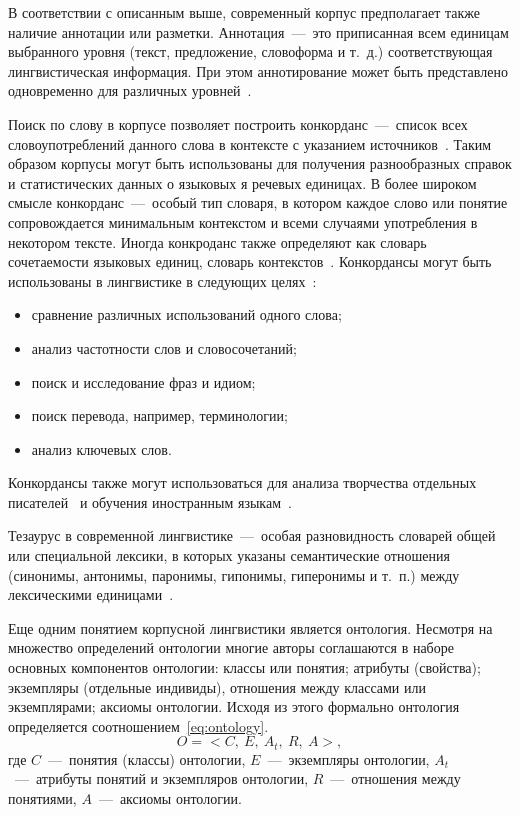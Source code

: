 В соответствии с описанным выше, современный корпус предполагает также наличие аннотации или разметки. Аннотация~---~это приписанная всем единицам выбранного уровня (текст, предложение, словоформа и т.~д.) соответствующая лингвистическая информация. При этом аннотирование может быть представлено одновременно для различных уровней~\cite{Kopotev}.

Поиск по слову в корпусе позволяет построить конкорданс~---~список всех словоупотреблений данного слова в контексте с указанием источников~\cite{Zaharov}. Таким образом корпусы могут быть использованы для получения разнообразных справок и статистических данных о языковых я речевых единицах. В более широком смысле конкорданс~---~особый тип словаря, в котором каждое слово или понятие сопровождается минимальным контекстом и всеми случаями употребления в некотором тексте. Иногда конкроданс также определяют как словарь сочетаемости языковых единиц, словарь контекстов~\cite{concordanceDominican}. Конкордансы могут быть использованы в лингвистике в следующих целях~\cite{Dobrinina}:
\begin{itemize}
	\item сравнение различных использований одного слова;
	\item анализ частотности слов и словосочетаний;
	\item поиск и исследование фраз и идиом;
	\item поиск перевода, например, терминологии;
	\item анализ ключевых слов.
\end{itemize}
Конкордансы также могут использоваться для анализа творчества отдельных писателей~\cite{Kalinkin,Vasilev} и обучения иностранным языкам~\cite{Nagel}.

Тезаурус в современной лингвистике~---~особая разновидность словарей общей или специальной лексики, в которых указаны семантические отношения (синонимы, антонимы, паронимы, гипонимы, гиперонимы и т.~п.) между лексическими единицами~\cite{Kopotev}.

Еще одним понятием корпусной лингвистики является онтология. Несмотря на множество определений онтологии многие авторы соглашаются в наборе основных компонентов онтологии: классы или понятия; атрибуты (свойства); экземпляры (отдельные индивиды), отношения между классами или экземплярами; аксиомы онтологии. Исходя из этого формально онтология определяется соотношением~\ref{eq:ontology}.
\begin{equation}
	\label{eq:ontology}
	O = <C,\ E,\ A_t,\ R,\ A>,
\end{equation}
где $C$~---~понятия (классы) онтологии, \newline
$E$~---~экземпляры онтологии, \newline
$A_t$~---~атрибуты понятий и экземпляров онтологии, \newline
$R$~---~отношения между понятиями, \newline
$A$~---~аксиомы онтологии.

